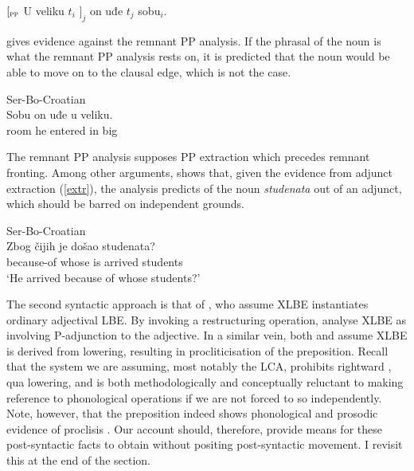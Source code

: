 \documentclass[output=paper]{langsci/langscibook}
\begin{document}
\begin{exe}
	\ex $[_{\textsc{pp}}$ U veliku $t_i$ $]_j$ on uđe $t_j$ sobu$_i$.
    \hfill\citep[30, n.\ 79]{Boskovic:2005}
\end{exe}

\citet{Boskovic:2005} gives evidence against the remnant PP analysis. If the
phrasal  of the noun is what the remnant PP analysis rests on, it
is predicted that the noun would be able to move on to the clausal edge, which
is not the case.

\begin{exe}
    \ex Ser-Bo-Croatian\\
    \gll * Sobu on uđe u veliku. \\
	 {} room he entered in big \\\label{np-bad}
\end{exe}

The remnant PP analysis supposes PP extraction which precedes remnant fronting.
Among other arguments, \citet{Boskovic:2005} shows that, given the evidence
from adjunct extraction (\ref{extr}), the analysis predicts  of
the noun \emph{studenata} out of an adjunct, which should be barred on
independent grounds.

\begin{exe}
    \ex Ser-Bo-Croatian \parencite[32]{Boskovic:2005}\\
	\gll Zbog čijih je došao studenata? \\
	because-of whose is arrived students \\
	\trans `He arrived because of whose students?'\label{extr}
\end{exe}

The second syntactic approach is that of \citet{BorselyJaworska:1988}, who
assume XLBE instantiates ordinary adjectival \gls{LBE}. By invoking a restructuring operation,
\citet{BorselyJaworska:1988} analyse XLBE as involving
P-adjunction to the adjective. In a similar vein, both
\citet{Corver:1992} and \citet{FranksProgovac:1994} assume XLBE is derived from
lowering, resulting in procliticisation of the preposition. Recall that the
system we are assuming, most notably the \gls{LCA}, prohibits rightward , qua lowering, and is both
methodologically and conceptually reluctant to making reference to phonological
operations if we are not forced to so independently. Note, however, that the
preposition indeed shows phonological and prosodic evidence of proclisis
\citep{Talic:2013,Talic:2015}. Our account should, therefore, provide means for
these post-syntactic facts to obtain without positing post-syntactic movement.
I revisit this at the end of the section.
\end{document}
